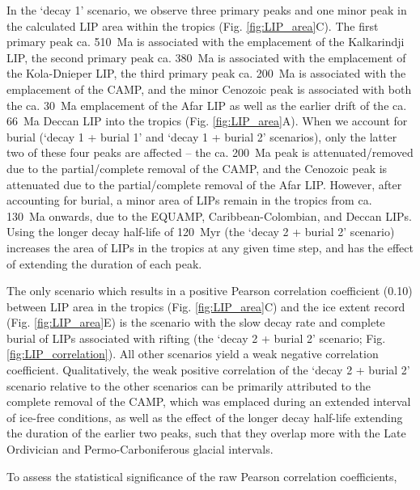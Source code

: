 \documentclass[11pt,letterpaper]{article}
\begin{document}
In the `decay 1' scenario, we observe three primary peaks and one minor peak in the calculated LIP area within the tropics (Fig. \ref{fig:LIP_area}C). The first primary peak ca. 510~Ma is associated with the emplacement of the Kalkarindji LIP, the second primary peak ca. 380~Ma is associated with the emplacement of the Kola-Dnieper LIP, the third primary peak ca. 200~Ma is associated with the emplacement of the CAMP, and the minor Cenozoic peak is associated with both the ca. 30~Ma emplacement of the Afar LIP as well as the earlier drift of the ca. 66~Ma Deccan LIP into the tropics (Fig. \ref{fig:LIP_area}A). When we account for burial (`decay 1 + burial 1' and `decay 1 + burial 2' scenarios), only the latter two of these four peaks are affected -- the ca. 200~Ma peak is attenuated/removed due to the partial/complete removal of the CAMP, and the Cenozoic peak is attenuated due to the partial/complete removal of the Afar LIP. However, after accounting for burial, a minor area of LIPs remain in the tropics from ca. 130~Ma onwards, due to the EQUAMP, Caribbean-Colombian, and Deccan LIPs. Using the longer decay half-life of 120~Myr (the `decay 2 + burial 2' scenario) increases the area of LIPs in the tropics at any given time step, and has the effect of extending the duration of each peak.

The only scenario which results in a positive Pearson correlation coefficient (0.10) between LIP area in the tropics (Fig. \ref{fig:LIP_area}C) and the ice extent record (Fig. \ref{fig:LIP_area}E) is the scenario with the slow decay rate and complete burial of LIPs associated with rifting (the `decay 2 + burial 2' scenario; Fig. \ref{fig:LIP_correlation}). All other scenarios yield a weak negative correlation coefficient. Qualitatively, the weak positive correlation of the `decay 2 + burial 2' scenario relative to the other scenarios can be primarily attributed to the complete removal of the CAMP, which was emplaced during an extended interval of ice-free conditions, as well as the effect of the longer decay half-life extending the duration of the earlier two peaks, such that they overlap more with the Late Ordivician and Permo-Carboniferous glacial intervals.

To assess the statistical significance of the raw Pearson correlation coefficients, 
\end{document}
